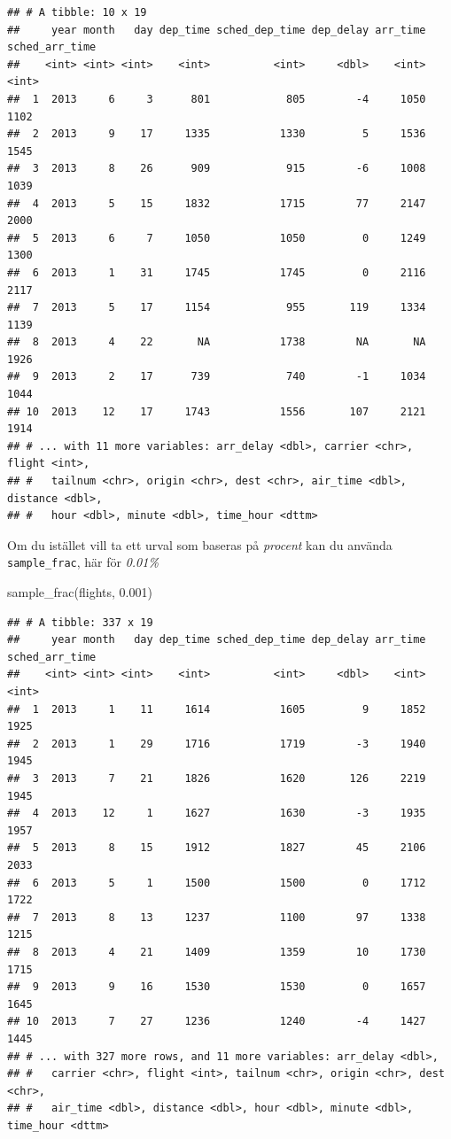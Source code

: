 \documentclass[
]{book}
\newenvironment{Shaded}{\begin{snugshade}}{\end{snugshade}}
\newcommand{\FloatTok}[1]{\textcolor[rgb]{0.00,0.00,0.81}{#1}}
\newcommand{\FunctionTok}[1]{\textcolor[rgb]{0.00,0.00,0.00}{#1}}
\newcommand{\NormalTok}[1]{#1}
\begin{document}
\begin{verbatim}
## # A tibble: 10 x 19
##     year month   day dep_time sched_dep_time dep_delay arr_time sched_arr_time
##    <int> <int> <int>    <int>          <int>     <dbl>    <int>          <int>
##  1  2013     6     3      801            805        -4     1050           1102
##  2  2013     9    17     1335           1330         5     1536           1545
##  3  2013     8    26      909            915        -6     1008           1039
##  4  2013     5    15     1832           1715        77     2147           2000
##  5  2013     6     7     1050           1050         0     1249           1300
##  6  2013     1    31     1745           1745         0     2116           2117
##  7  2013     5    17     1154            955       119     1334           1139
##  8  2013     4    22       NA           1738        NA       NA           1926
##  9  2013     2    17      739            740        -1     1034           1044
## 10  2013    12    17     1743           1556       107     2121           1914
## # ... with 11 more variables: arr_delay <dbl>, carrier <chr>, flight <int>,
## #   tailnum <chr>, origin <chr>, dest <chr>, air_time <dbl>, distance <dbl>,
## #   hour <dbl>, minute <dbl>, time_hour <dttm>
\end{verbatim}

Om du istället vill ta ett urval som baseras på \emph{procent} kan du använda \texttt{sample\_frac}, här för \emph{0.01\%}

\begin{Shaded}
\begin{Highlighting}[]
\FunctionTok{sample\_frac}\NormalTok{(flights, }\FloatTok{0.001}\NormalTok{)}
\end{Highlighting}
\end{Shaded}

\begin{verbatim}
## # A tibble: 337 x 19
##     year month   day dep_time sched_dep_time dep_delay arr_time sched_arr_time
##    <int> <int> <int>    <int>          <int>     <dbl>    <int>          <int>
##  1  2013     1    11     1614           1605         9     1852           1925
##  2  2013     1    29     1716           1719        -3     1940           1945
##  3  2013     7    21     1826           1620       126     2219           1945
##  4  2013    12     1     1627           1630        -3     1935           1957
##  5  2013     8    15     1912           1827        45     2106           2033
##  6  2013     5     1     1500           1500         0     1712           1722
##  7  2013     8    13     1237           1100        97     1338           1215
##  8  2013     4    21     1409           1359        10     1730           1715
##  9  2013     9    16     1530           1530         0     1657           1645
## 10  2013     7    27     1236           1240        -4     1427           1445
## # ... with 327 more rows, and 11 more variables: arr_delay <dbl>,
## #   carrier <chr>, flight <int>, tailnum <chr>, origin <chr>, dest <chr>,
## #   air_time <dbl>, distance <dbl>, hour <dbl>, minute <dbl>, time_hour <dttm>
\end{verbatim}
\end{document}
